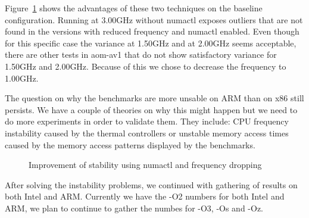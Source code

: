 Figure~\ref{fig:EncoderModeSpeed11RealtimeInputBosphorus4K} shows the advantages
of these two techniques on the baseline configuration. Running at 3.00GHz
without numactl exposes outliers that are not found in the versions with reduced
frequency and numactl enabled. Even though for this specific case the variance
at 1.50GHz and at 2.00GHz seems acceptable, there are other tests in aom-av1
that do not show satisfactory variance for 1.50GHz and 2.00GHz. Because of this
we chose to decrease the frequency to 1.00GHz.

The question on why the benchmarks are more unsable on ARM than on x86 still
persists. We have a couple of theories on why this might happen but we need to
do more experiments in order to validate them. They include: CPU frequency
instability caused by the thermal controllers or unstable memory access times
caused by the memory access patterns displayed by the benchmarks. 

\begin{figure}[H]
  \centering
  
  \caption{Improvement of stability using numactl and frequency dropping}
  \label{fig:EncoderModeSpeed11RealtimeInputBosphorus4K}
\end{figure}

After solving the instability problems, we continued with gathering of results
on both Intel and ARM. Currently we have the -O2 numbers for both Intel and ARM,
we plan to continue to gather the numbes for -O3, -Os and -Oz.
